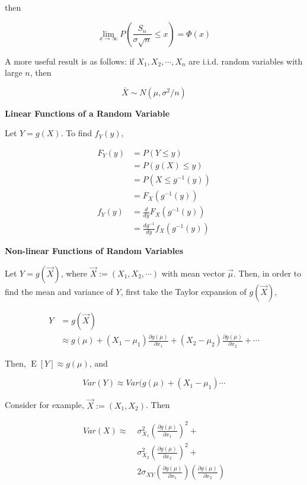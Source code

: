 \documentclass[a4paper]{article}
\newcommand{\subheading}[1]{{\scriptsize\textbf{#1}}}
\newcommand{\expectation}[1]{\operatorname{E}[#1]}
\begin{document}
\begin{multicols*}{4}
then

$$\lim_{x\rightarrow \infty}
  P \left ( \frac{S_n}{\sigma \sqrt{n}} \leq x \right )
  = \Phi(x)$$

A more useful result is as follows: if $X_1, X_2, \cdots, X_n$ are i.i.d. random
variables with large $n$, then

$$\bar{X} \sim N(\mu, \sigma^2/n)$$

\subheading{Linear Functions of a Random Variable}

Let $Y = g(X)$. To find $f_Y(y)$,

\begin{align*}
  F_Y(y) &= P(Y \leq y) \\
    &= P(g(X) \leq y) \\
    &= P(X \leq g^{-1}(y)) \\
    &= F_X(g^{-1}(y)) \\
  f_Y(y) &= \frac{d}{dy} F_X(g^{-1}(y)) \\
    &= \frac{dg^{-1}}{dy} f_X(g^{-1}(y))
\end{align*}

\subheading{Non-linear Functions of Random Variables}

Let $Y = g(\vec{X})$, where $\vec{X} := (X_1, X_2, \cdots)$ with mean vector
$\vec{\mu}$. Then, in order to find the mean and variance of $Y$, first take the
Taylor expansion of $g(\vec{X})$,

\begin{align*}
  Y &= g(\vec{X}) \\
    &\approx
      g(\mu) +
      (X_1 - \mu_1)\frac{\partial g(\mu)}{\partial x_1} +
      (X_2 - \mu_2)\frac{\partial g(\mu)}{\partial x_2} + \cdots
\end{align*}

Then, $\expectation{Y} \approx g(\mu)$, and 

$$Var(Y) \approx Var(g(\mu) + (X_1 - \mu_1)\cdots$$

Consider for example, $\vec{X} := (X_1, X_2)$. Then

\begin{align*}
Var(X) \approx\;
  &\sigma^2_{X_1} \left ( \frac{\partial g(\mu)}{\partial x_1} \right )^2 + \\
  &\sigma^2_{X_2} \left ( \frac{\partial g(\mu)}{\partial x_2} \right )^2 + \\
  &2\sigma_{XY} \left ( \frac{\partial g(\mu)}{\partial x_1} \right )
  \left ( \frac{\partial g(\mu)}{\partial x_2} \right )
\end{align*}


\end{multicols*}
\end{document}
